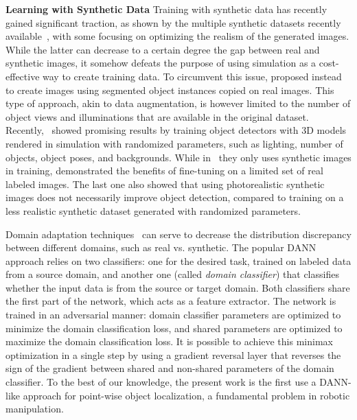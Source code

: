 \documentclass[letterpaper, 10 pt, conference]{ieeeconf}  %
\begin{document}
\textbf{Learning with Synthetic Data}
Training with synthetic data has recently gained significant traction, as shown by the multiple synthetic datasets recently available~\cite{gaidon2016virtual,mayer2016large,qiu2016unrealcv,ros2016synthia,johnson2017driving, richter2017playing}, with some focusing on optimizing the realism of the generated images. While the latter can decrease to a certain degree the gap between real and synthetic images, it somehow defeats the purpose of using simulation as a cost-effective way to create training data. To circumvent this issue, \cite{dwibedi2017cut,georgakis2017synthesizing} proposed instead to create images using segmented object instances copied on real images. This type of approach, akin to data augmentation, is however limited to the number of object views and illuminations that are available in the original dataset.
Recently,~\cite{hinterstoisser2017pre,tremblay2018training} showed promising results by training object detectors with 3D models rendered in simulation with randomized parameters, such as lighting, number of objects, object poses, and backgrounds. While in~\cite{hinterstoisser2017pre} they only uses synthetic images in training, \cite{tremblay2018training} demonstrated the benefits of fine-tuning on a limited set of real labeled images. The last one also showed that using photorealistic synthetic images does not necessarily improve object detection, compared to training on a less realistic synthetic dataset generated with randomized parameters.

Domain adaptation techniques~\cite{wang2018deep,csurka2017domain} can serve to decrease the distribution discrepancy between different domains, such as real vs. synthetic. The popular DANN~\cite{ganin2016domain} approach relies on two classifiers: one for the desired task, trained on labeled data from a source domain, and another one (called \emph{domain classifier}) that classifies whether the input data is from the source or target domain. Both classifiers share the first part of the network, which acts as a feature extractor. The network is trained in an adversarial manner: domain classifier parameters are optimized to minimize the domain classification loss, and shared parameters are optimized to maximize the domain classification loss. It is possible to achieve this minimax optimization in a single step by using a gradient reversal layer that reverses the sign of the gradient between shared and non-shared parameters of the domain classifier. To the best of our knowledge, the present work is the first use a DANN-like approach for point-wise object localization, a fundamental problem in robotic manipulation.
\end{document}

